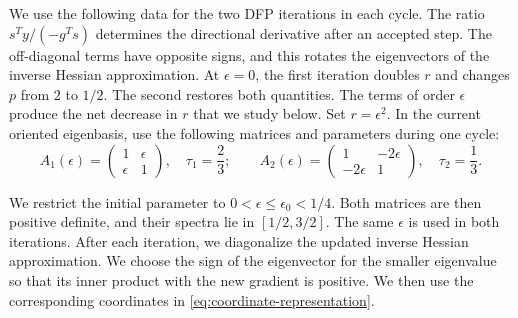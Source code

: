 \documentclass[11pt]{article}
\begin{document}
We use the following data for the two DFP iterations in each cycle.  The ratio
$s^Ty/(-g^Ts)$ determines the directional derivative after an accepted step.
The off-diagonal terms have opposite signs, and this rotates the eigenvectors
of the inverse Hessian approximation.  At $\epsilon=0$, the first iteration
doubles $r$ and changes $p$ from $2$ to $1/2$.  The second restores both
quantities.  The terms of order $\epsilon$ produce the net decrease in $r$
that we study below.  Set $r=\epsilon^2$.  In the current oriented eigenbasis,
use the following matrices and parameters during one cycle:
\begin{equation}\label{eq:alternating-secant-data}
A_1(\epsilon)=
\begin{pmatrix}1&\epsilon\\ \epsilon&1\end{pmatrix},
\quad \tau_1=\frac23;
\qquad
A_2(\epsilon)=
\begin{pmatrix}1&-2\epsilon\\ -2\epsilon&1\end{pmatrix},
\quad \tau_2=\frac13.
\end{equation}

We restrict the initial parameter to
$0<\epsilon\le\epsilon_0<1/4$.  Both matrices are then positive definite, and
their spectra lie in $[1/2,3/2]$.  The same $\epsilon$ is used in both
iterations.  After each iteration, we diagonalize the updated inverse Hessian
approximation.  We choose the sign of the eigenvector for the smaller
eigenvalue so that its inner product with the new gradient is positive.  We
then use the corresponding coordinates in
\eqref{eq:coordinate-representation}.
\end{document}
